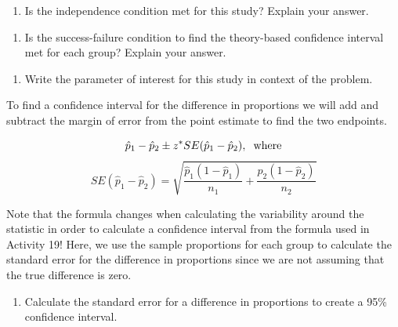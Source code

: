 \documentclass[
]{report}
\providecommand{\tightlist}{%
  \setlength{\itemsep}{0pt}\setlength{\parskip}{0pt}}
\begin{document}
\begin{enumerate}
\def\labelenumi{\arabic{enumi}.}
\setcounter{enumi}{2}
\tightlist
\item
  Is the independence condition met for this study? Explain your answer.
\end{enumerate}

\vspace{0.8in}

\begin{enumerate}
\def\labelenumi{\arabic{enumi}.}
\setcounter{enumi}{3}
\tightlist
\item
  Is the success-failure condition to find the theory-based confidence interval met for each group? Explain your answer.
\end{enumerate}

\vspace{1in}

\begin{enumerate}
\def\labelenumi{\arabic{enumi}.}
\setcounter{enumi}{4}
\tightlist
\item
  Write the parameter of interest for this study in context of the problem.
\end{enumerate}

\vspace{0.8in}

To find a confidence interval for the difference in proportions we will add and subtract the margin of error from the point estimate to find the two endpoints.

\[\hat{p}_1-\hat{p}_2\pm z^*SE(\hat{p}_1-\hat{p}_2), \hspace{.2cm} \text{where}\]
\[SE(\hat{p}_1-\hat{p}_2) = \sqrt{\frac{\hat{p}_1 (1-\hat{p}_1)}{n_1}+\frac{\hat{p}_2 (1-\hat{p}_2)}{n_2}}\]

Note that the formula changes when calculating the variability around the statistic in order to calculate a confidence interval from the formula used in Activity 19! Here, we use the sample proportions for each group to calculate the standard error for the difference in proportions since we are not assuming that the true difference is zero.

\begin{enumerate}
\def\labelenumi{\arabic{enumi}.}
\setcounter{enumi}{5}
\tightlist
\item
  Calculate the standard error for a difference in proportions to create a 95\% confidence interval.
\end{enumerate}

\vspace{1in}
\end{document}
